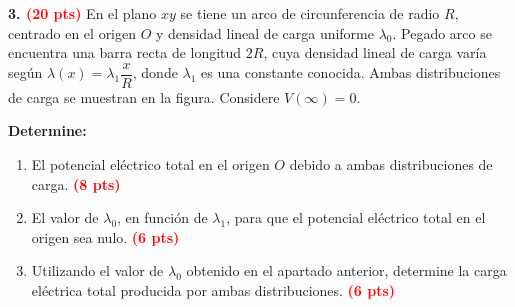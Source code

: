 \documentclass[12pt]{article}
\begin{document}
\noindent
\textbf{3. \textcolor{red}{(20 pts)}} 
En el plano $xy$ se tiene un arco de circunferencia de radio $R$, 
centrado en el origen $O$ y densidad lineal de carga uniforme $\lambda_0$. Pegado arco
se encuentra una barra recta de longitud $2R$, cuya densidad lineal 
de carga varía según 
$\lambda(x)=\lambda_1\dfrac{x}{R}$, donde $\lambda_1$ es una 
constante conocida. Ambas distribuciones de carga se muestran en la 
figura. Considere $V(\infty)=0$.

\vspace{0.25cm}

\noindent
\begin{minipage}[t]{0.58\textwidth}
\vspace{0pt}

\textbf{Determine:}

\vspace{0.25cm}

\begin{enumerate}[
    label=\alph*),
    leftmargin=0.55cm,
    labelsep=0.15cm,
    itemsep=0.55cm,
    topsep=0pt
]

    \item El potencial eléctrico total en el origen $O$ debido a 
    ambas distribuciones de carga. \textcolor{red}{\textbf{(8 pts)}}

    \item El valor de $\lambda_0$, en función de $\lambda_1$, para 
    que el potencial eléctrico total en el origen sea nulo. \textcolor{red}{\textbf{(6 pts)}}

    \item Utilizando el valor de $\lambda_0$ obtenido en el apartado 
    anterior, determine la carga eléctrica total producida por ambas distribuciones. \textcolor{red}{\textbf{(6 pts)}}

\end{enumerate}

\end{minipage}
\hfill
%
\end{document}
